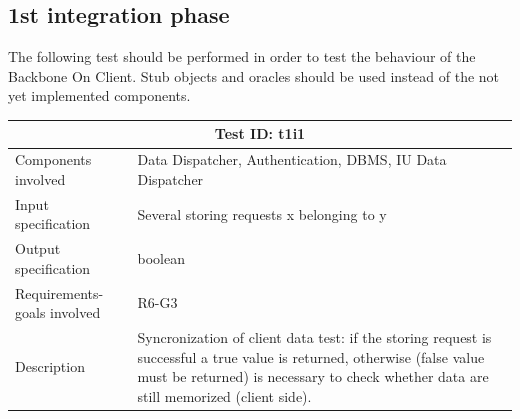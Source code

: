 \subsection{1st integration phase}
The following test should be performed in order to test the behaviour of the Backbone On Client. Stub objects and oracles should be used instead of the not yet implemented components.

\begin{table}[H]
\centering
\begin{tabular}{ |p{4.5cm}||p{11cm}|  }
 \hline
 \multicolumn{2}{|c|}{Test ID: t1i1} \\
 
 \hline 
 Components involved  	& 	 Data Dispatcher, Authentication, DBMS, IU Data Dispatcher\\
 Input specification  	& 	 Several storing requests x belonging to y\\
Output specification  	& boolean\\
Requirements-goals involved & R6-G3\\
Description  	& 	Syncronization of client data test: if the storing request is successful a true value is returned, otherwise (false value must be returned) is necessary to check whether data are still memorized (client side).\\
 \hline
\end{tabular}
\end{table}


